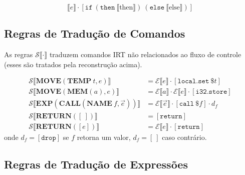 \[
  \llbracket e \rrbracket \cdot
  [\mathtt{if}\ (\mathtt{then}\ \llbracket\text{then}\rrbracket)\ (\mathtt{else}\ \llbracket\text{else}\rrbracket)]
\]

\subsection{Regras de Tradução de Comandos}\label{subsec:trans-stmts}

As regras $\mathcal{S}\llbracket \cdot \rrbracket$ traduzem comandos IRT não
relacionados ao fluxo de controle (esses são tratados pela reconstrução acima).

\begin{Definition}\label{def:trans-stmts}
  \begin{align*}
    \mathcal{S}\llbracket \mathbf{MOVE}(\mathbf{TEMP}\ t, e) \rrbracket
    &= \mathcal{E}\llbracket e \rrbracket \cdot [\mathtt{local.set}\ \$t] \\
    \mathcal{S}\llbracket \mathbf{MOVE}(\mathbf{MEM}(a), e) \rrbracket
    &= \mathcal{E}\llbracket a \rrbracket \cdot \mathcal{E}\llbracket
    e \rrbracket \cdot [\mathtt{i32.store}] \\
    \mathcal{S}\llbracket
    \mathbf{EXP}(\mathbf{CALL}(\mathbf{NAME}\ f, \vec{e})) \rrbracket
    &= \mathcal{E}\llbracket \vec{e} \rrbracket \cdot
    [\mathtt{call}\ \$f] \cdot d_f \\
    \mathcal{S}\llbracket \mathbf{RETURN}([\ ]) \rrbracket
    &= [\mathtt{return}] \\
    \mathcal{S}\llbracket \mathbf{RETURN}([e]) \rrbracket
    &= \mathcal{E}\llbracket e \rrbracket \cdot [\mathtt{return}]
  \end{align*}
  onde $d_f = [\mathtt{drop}]$ se $f$ retorna um valor, $d_f = [\ ]$
  caso contrário.
\end{Definition}

\subsection{Regras de Tradução de Expressões}\label{subsec:trans-exprs}


